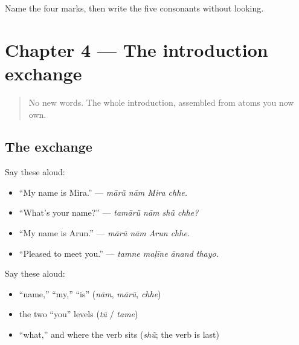 \begin{tcolorbox}[breakable,colback=teal!4,colframe=teal!35!black,title={Before you move on}]
Name the four marks, then write the five consonants without looking.
\end{tcolorbox}
\section[Practice]{Chapter 4 — The introduction exchange}

\label{lesson:GU-C02-practice}



\begin{quote}
No new words. The whole introduction, assembled from atoms you now own.
\end{quote}

\subsection*{The exchange}
Say these aloud:

\begin{itemize}
\raggedright
  \item \textquotedblleft{}My name is Mira.\textquotedblright{} — \emph{mārũ nām Mira chhe.}
  \item \textquotedblleft{}What's your name?\textquotedblright{} — \emph{tamārũ nām shũ chhe?}
  \item \textquotedblleft{}My name is Arun.\textquotedblright{} — \emph{mārũ nām Arun chhe.}
  \item \textquotedblleft{}Pleased to meet you.\textquotedblright{} — \emph{tamne maḷīne ānand thayo.}
\end{itemize}

\begin{cousinweb}
Say these aloud:

\begin{itemize}
\raggedright
  \item \textquotedblleft{}name,\textquotedblright{} \textquotedblleft{}my,\textquotedblright{} \textquotedblleft{}is\textquotedblright{} (\emph{nām}, \emph{mārũ}, \emph{chhe})
  \item the two \textquotedblleft{}you\textquotedblright{} levels (\emph{tũ} / \emph{tame})
  \item \textquotedblleft{}what,\textquotedblright{} and where the verb sits (\emph{shũ}; the verb is last)
\end{itemize}
\end{cousinweb}

